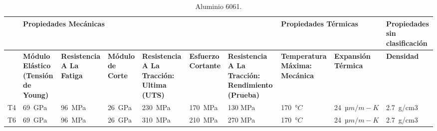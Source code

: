 \begin{landscape}
	\begin{table}[H]
		\centering
		\small
		\caption{Aluminio 6061.}
			\begin{tabular}{|p{1.5em}|p{5.355em}|p{5.355em}|p{5.355em}|p{5.355em}|p{4.645em}|p{7em}|p{6.285em}|p{5.8em}|p{5.93em}|}
			\hline
			\multicolumn{1}{|r|}{} & \multicolumn{6}{p{39.995em}|}{\cellcolor[rgb]{ .851,  .882,  .949}\textbf{Propiedades Mecánicas}} & \multicolumn{2}{p{13.64em}|}{\cellcolor[rgb]{ .988,  .894,  .839}\textbf{Propiedades Térmicas}} & \cellcolor[rgb]{ 1,  .949,  .8}\textbf{Propiedades sin clasificación} \\
			\hline
			\multicolumn{1}{|r|}{} & \cellcolor[rgb]{ .851,  .882,  .949}\textbf{Módulo Elástico (Tensión de Young)} & \cellcolor[rgb]{ .851,  .882,  .949}\textbf{Resistencia A La Fatiga} & \cellcolor[rgb]{ .851,  .882,  .949}\textbf{Módulo de Corte} & \cellcolor[rgb]{ .851,  .882,  .949}\textbf{Resistencia A La Tracción: Ultima (UTS)} & \cellcolor[rgb]{ .851,  .882,  .949}\textbf{Esfuerzo Cortante} & \cellcolor[rgb]{ .851,  .882,  .949}\textbf{Resistencia A La Tracción: Rendimiento (Prueba)} & \cellcolor[rgb]{ .988,  .894,  .839}\textbf{Temperatura Máxima: Mecánica} & \cellcolor[rgb]{ .988,  .894,  .839}\textbf{Expansión Térmica} & \cellcolor[rgb]{ 1,  .949,  .8}\textbf{Densidad} \\
			\hline
			T4    & 69 GPa & 96 MPa & 26 GPa & 230 MPa & 170 MPa & 130 MPa & 170 $°C$ & 24 $µm/m-K$ & 2.7 g/cm3 \\
			\hline
			T6    & 69 GPa & 96 MPa & 26 GPa & 310 MPa & 210 MPa & 270 MPa & 170 $°C$ & 24 $µm/m-K$ & 2.7 g/cm3 \\
			\hline
		\end{tabular}%
		\label{tab:Alu6061}%
		
	\end{table}%
\end{landscape}

